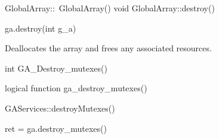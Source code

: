 \documentclass[12pt]{article}
\begin{document}
\begin{cxxapi}
\begin{cxxcode}
GlobalArray::~GlobalArray()
void GlobalArray::destroy()
\end{cxxcode}
\end{cxxapi}

\begin{pyapi}
\begin{pycode}
ga.destroy(int g_a)
\end{pycode}
\begin{funcargs}
\end{funcargs}
\end{pyapi}

\gcoll

\begin{desc}

Deallocates the array and frees any associated resources.

\end{desc}


\begin{capi}
\begin{ccode}
int GA_Destroy_mutexes()
\end{ccode}
\begin{funcargs}
\end{funcargs}
\end{capi}

\begin{fapi}
\begin{fcode}
logical function ga_destroy_mutexes()
\end{fcode}
\end{fapi}

\begin{cxxapi}
\begin{cxxcode}
GAServices::destroyMutexes()
\end{cxxcode}
\end{cxxapi}

\begin{pyapi}
\begin{pycode}
ret = ga.destroy_mutexes()
\end{pycode}
\begin{funcargs}
\end{funcargs}
\end{pyapi}

\wcoll
\end{document}
